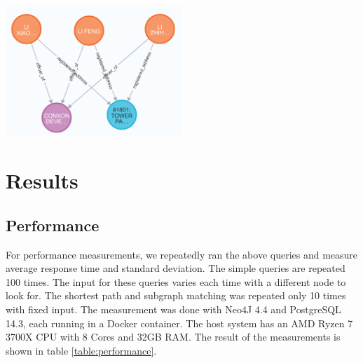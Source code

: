 \documentclass[11pt, a4paper,oneside,chapterprefix=false]{scrbook}
\begin{document}
\begin{center}
\includegraphics*[width=0.5\textwidth]{figures/query_relation.png}
\end{center}



%
%





\chapter{Results} \label{chp:results}

\section{Performance}

For performance measurements, we repeatedly ran the above queries and measure average response time and standard deviation.
The simple queries are repeated 100 times.
The input for these queries varies each time with a different node to look for.
The shortest path and subgraph matching was repeated only 10 times with fixed input.
The measurement was done with Neo4J 4.4 and PostgreSQL 14.3, each running in a Docker container.
The host system has an AMD Ryzen 7 3700X CPU with 8 Cores and 32GB RAM.
The result of the measurements is shown in table \ref{table:performance}.
\end{document}
